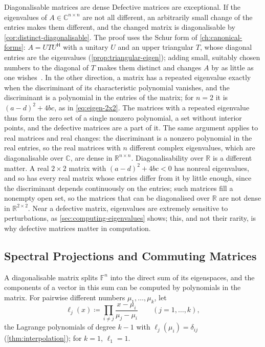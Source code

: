 \begin{note}{Diagonalisable matrices are dense}
Defective matrices are exceptional. If the eigenvalues of $A\in\mathbb C^{n\times n}$ are not all different, an arbitrarily small change of the entries makes them different, and the changed matrix is diagonalisable by \cref{cor:distinct-diagonalisable}. The proof uses the Schur form of \cref{ch:canonical-forms}: $A=UTU^{\mathsf H}$ with a unitary $U$ and an upper triangular $T$, whose diagonal entries are the eigenvalues (\cref{prop:triangular-eigen}); adding small, suitably chosen numbers to the diagonal of $T$ makes them distinct and changes $A$ by as little as one wishes~\cite[Sect.~2.4]{horn2013}. In the other direction, a matrix has a repeated eigenvalue exactly when the discriminant of its characteristic polynomial vanishes, and the discriminant is a polynomial in the entries of the matrix; for $n=2$ it is $(a-d)^2+4bc$, as in \eqref{eq:eigen-2x2}. The matrices with a repeated eigenvalue thus form the zero set of a single nonzero polynomial, a set without interior points, and the defective matrices are a part of it. The same argument applies to real matrices and real changes: the discriminant is a nonzero polynomial in the real entries, so the real matrices with $n$ different complex eigenvalues, which are diagonalisable over $\mathbb C$, are dense in $\mathbb R^{n\times n}$. Diagonalisability over $\mathbb R$ is a different matter. A real $2\times2$ matrix with $(a-d)^2+4bc<0$ has nonreal eigenvalues, and so has every real matrix whose entries differ from it by little enough, since the discriminant depends continuously on the entries; such matrices fill a nonempty open set, so the matrices that can be diagonalised over $\mathbb R$ are not dense in $\mathbb R^{2\times2}$. Near a defective matrix, eigenvalues are extremely sensitive to perturbations, as \cref{sec:computing-eigenvalues} shows; this, and not their rarity, is why defective matrices matter in computation.
\end{note}

\subsection{Spectral Projections and Commuting Matrices}

A diagonalisable matrix splits $\mathbb F^n$ into the direct sum of its eigenspaces, and the components of a vector in this sum can be computed by polynomials in the matrix. For pairwise different numbers $\mu_1,\ldots,\mu_k$, let
\begin{equation}
\ell_j(x)\coloneqq\prod_{i\ne j}\frac{x-\mu_i}{\mu_j-\mu_i}\qquad(j=1,\ldots,k),
\label{eq:lagrange-basis}
\end{equation}
the Lagrange polynomials of degree $k-1$ with $\ell_j(\mu_i)=\delta_{ij}$ (\cref{thm:interpolation}); for $k=1$, $\ell_1=1$.

